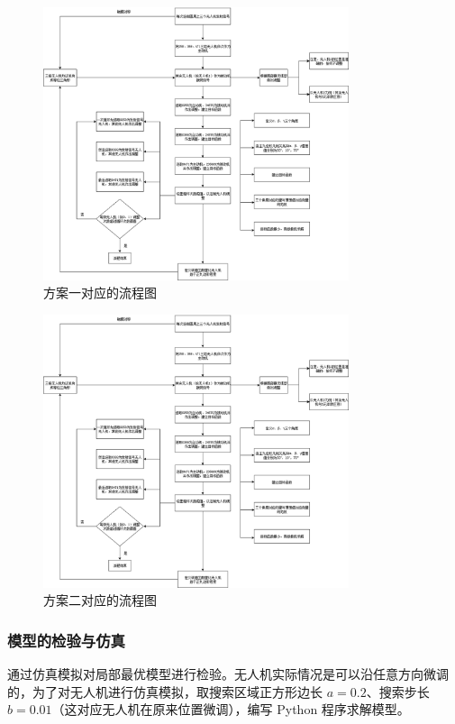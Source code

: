 \documentclass[withoutpreface,bwprint]{cumcmthesis} %
\begin{document}
\begin{figure}[H]
    \centering
    \includegraphics[width=0.8\textwidth]{../figure/q3_2.png} 
    \caption{方案一对应的流程图}
    \label{q3_2}    
\end{figure}


\begin{figure}[H]
    \centering
    \includegraphics[width=0.8\textwidth]{../figure/q3_2.png} 
    \caption{方案二对应的流程图}
    \label{q3_2}    
\end{figure}


\subsubsection{模型的检验与仿真}
通过仿真模拟对局部最优模型进行检验。无人机实际情况是可以沿任意方向微调的，为了对无人机进行仿真模拟，取搜索区域正方形边长 \( a = 0.2 \)、搜索步长 \( b = 0.01 \)（这对应无人机在原来位置微调），编写 Python 程序求解模型。
\end{document}
